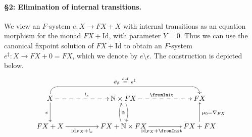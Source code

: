 \documentclass[oribibl,envcountsame,envcountsect,runningheads]{llncs}
\newcommand{\cat}[1]{\ensuremath{\mathbf{#1}}}
\newcommand{\toFinal}[1]{{!_{#1}}}\DeclareMathSymbol{\fromInit}{\mathord}{operators}{"3C}
\newcommand{\N}{\mathbb{N}} \newcommand{\Z}{\mathbb{Z}} \newcommand{\C}{\cat{C}}
\renewcommand{\>}{\rangle}
\def\id{\mathrm{id}}
\def\Id{\mathrm{Id}}
\def\altsol#1{{#1}^\ddag}
\def\epselim#1{{#1}\!\setminus\! \epsilon}
\def\:{\colon}
\def\GF{F} \def\GFG{G} \def\MM{R} \def\quot{\xi} \def\quotG{\gamma}
\begin{document}
\paragraph{\bf \S 2: Elimination of internal transitions.}
We view an $\GF $-system $e \: X \to \GF X + X$ with internal transitions as an equation morphism for the monad $\GF X + \Id$, with parameter $Y = 0$. Thus we can use the canonical fixpoint solution of $\GF X + \Id$ to obtain an $\GF $-system $\altsol e\: X \to \GF X + 0 = \GF X$, which we denote by $\epselim{e}$. The construction is depicted below.
\begin{eqnarray}\label{diag:cansolHX+Id}
\vcenter{
    \xymatrix@R=10pt@C=20pt{
      X  \ar@{-->}[rr]^{\toFinal{e}} \ar[dd]_{e} & & \N \times \GF X \ar@/^/[dd]_{\cong} \ar@{-->}[rr]^{\fromInit} & & \GF X \ar@{<-} `u[l] `[llll]_{\epselim{e}\ \stackrel{\mathrm{def}}=\ \altsol e} [llll] \\
      & & & &  
      \\
      \GF X + X  \ar[rr]_-{\id_{\GF X} +\toFinal{e}} & & \GF X + \N \times \GF X \ar@/^/[uu]
      \ar[rr]_{ \id_{\GF X} + \fromInit} & & \GF X + \GF X\ar[uu]_{\mu_0 = \nabla_{\GF X}}\\
    }
}
\end{eqnarray}
\end{document}
